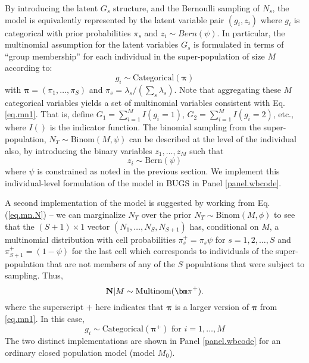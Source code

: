 By introducing the latent $G_{s}$ structure, and the Bernoulli
sampling of $N_{s}$, the model is equivalently represented by the
latent variable pair $(g_{i},z_{i})$ where $g_{i}$ is categorical with
prior probabilities $\pi_{s}$ and $z_{i} \sim Bern(\psi)$.  In
particular, the multinomial assumption for the latent variables
$G_{s}$ is formulated in terms of ``group membership'' for each
individual in the super-population of size $M$ according to:
\[
 g_{i} \sim \mbox{Categorical}\left( {\bm \pi} \right)
\]
with ${\bm \pi} = (\pi_{1}, \ldots, \pi_{S})$ and $\pi_{s} =
\lambda_{s}/(\sum_{s} \lambda_{s})$.  Note that aggregating these $M$
categorical variables yields a set of multinomial variables consistent
with Eq. \ref{eq.mn1}. That is, define $G_{1} = \sum_{i=1}^{M} I(g_{i}
= 1)$, $G_{2} = \sum_{i=1}^{M} I(g_{i} = 2)$, etc., where $I()$ is the
indicator function.  The binomial sampling from the super-population,
$N_{T} \sim \mbox{Binom}(M, \psi)$
can be described at the level of the individual also, 
 by introducing the binary
variables $z_{1},\ldots,z_{M}$ such that
\[
 z_{i} \sim \mbox{Bern}(\psi)
\]
where $\psi$ is constrained as noted in the previous section. 
We implement this individual-level formulation of the model in BUGS in
Panel \ref{panel.wbcode}.



A second implementation of the model is suggested by working from
Eq. (\ref{eq.mn.N}) -- we can marginalize $N_{T}$
over the prior  $N_{T} \sim \mbox{Binom}(M, \phi)$ to see that 
the  $(S+1) \times 1$ vector 
$(N_{1},\ldots,N_{S},N_{S+1})$ has, conditional on $M$, 
a multinomial distribution 
with cell probabilities
$\pi_{s}^{+} = \pi_{s} \psi$ for $s=1,2,\ldots,S$  and 
 $\pi_{S+1}^{+} = (1-\psi)$ for the last cell which
 corresponds to individuals of the super-population that are not
 members of any of the $S$ populations that were subject to sampling. 
Thus,
\[
{\bf N}|M \sim \mbox{Multinom}({\bm \pi}^{+}).
\]
where the superscript $+$ here indicates that ${\bm \pi}$ is a larger
version of ${\bm \pi}$ from \ref{eq.mn1}.  In this case,
\begin{equation}
g_{i}  \sim \mbox{Categorical}( {\bm \pi}^{+} ) \mbox{ for
  $i=1,\ldots,M$}  \label{eq.parm1c}
\end{equation}
The two distinct implementations are shown in 
Panel \ref{panel.wbcode} for an ordinary closed population model
(model $M_{0}$).


